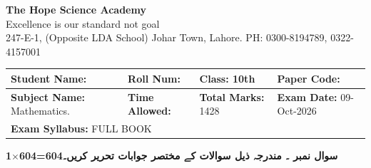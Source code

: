 \documentclass[11pt,a4paper]{article}
\newcommand{\lr}[1]{\beginL #1\endL}
\begin{document}
\begin{center}
  {\Huge\bfseries The Hope Science Academy}\\[3pt]
  {\small Excellence is our standard not goal}\\[2pt]
  {\small 247-E-1, (Opposite LDA School) Johar Town, Lahore. PH: 0300-8194789, 0322-4157001}
\end{center}
\medskip\noindent
\begin{tabularx}{\linewidth}{|X|X|X|X|}
\hline
\textbf{Student Name:} & \textbf{Roll Num:} & \textbf{Class:} 10th & \textbf{Paper Code:} \\ \hline
\textbf{Subject Name:} Mathematics. & \textbf{Time Allowed:} & \textbf{Total Marks:} 1428 & \textbf{Exam Date:} 09-Oct-2026 \\ \hline
\multicolumn{4}{|l|}{\textbf{Exam Syllabus:} FULL BOOK} \\ \hline
\end{tabularx}
\bigskip
\medskip\noindent\textbf{1$\times$604=604}\hfill{\urdufont\beginR\textbf{سوال نمبر \lr{4}۔ مندرجہ ذیل سوالات کے مختصر جوابات تحریر کریں۔}\endR}\par
\end{document}
